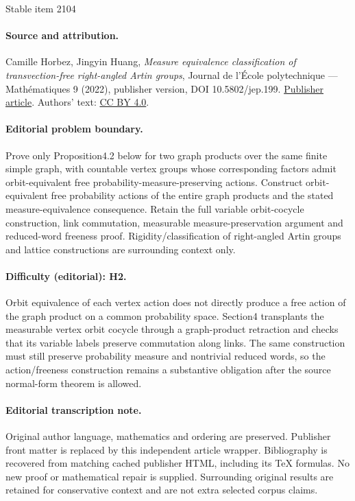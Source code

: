 \documentclass[11pt]{article}
\numberwithin{equation}{section}
\theoremstyle{plain}
\theoremstyle{definition}
\begin{document}
\begin{center}{\Large Stable item 2104}\end{center}
\paragraph{Source and attribution.}
Camille Horbez, Jingyin Huang, \emph{Measure equivalence classification of transvection-free right-angled Artin groups}, Journal de l’École polytechnique — Mathématiques 9 (2022), publisher version, DOI 10.5802/jep.199. \href{https://jep.centre-mersenne.org/articles/10.5802/jep.199/}{Publisher article}. Authors' text: \href{https://creativecommons.org/licenses/by/4.0/}{CC BY 4.0}.
\paragraph{Editorial problem boundary.}
Prove only Proposition4.2 below for two graph products over the same finite simple graph, with countable vertex groups whose corresponding factors admit orbit-equivalent free probability-measure-preserving actions. Construct orbit-equivalent free probability actions of the entire graph products and the stated measure-equivalence consequence. Retain the full variable orbit-cocycle construction, link commutation, measurable measure-preservation argument and reduced-word freeness proof. Rigidity/classification of right-angled Artin groups and lattice constructions are surrounding context only.
\paragraph{Difficulty (editorial): H2.}
Orbit equivalence of each vertex action does not directly produce a free action of the graph product on a common probability space. Section4 transplants the measurable vertex orbit cocycle through a graph-product retraction and checks that its variable labels preserve commutation along links. The same construction must still preserve probability measure and nontrivial reduced words, so the action/freeness construction remains a substantive obligation after the source normal-form theorem is allowed.
\paragraph{Editorial transcription note.}
Original author language, mathematics and ordering are preserved. Publisher front matter is replaced by this independent article wrapper. Bibliography is recovered from matching cached publisher HTML, including its TeX formulas. No new proof or mathematical repair is supplied. Surrounding original results are retained for conservative context and are not extra selected corpus claims.
\clearpage
\end{document}
